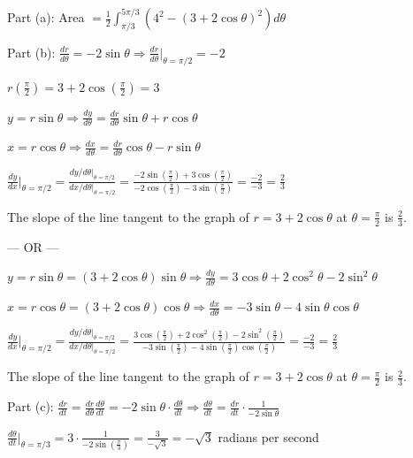 \documentclass[12pt,addpoints,answers]{exam}
\begin{document}
\begin{questions}
\begin{solution}
Part (a): Area $= \frac{1}{2}\int_{\pi/3}^{5\pi/3} \left(4^2 - (3 + 2\cos\theta)^2\right) d\theta$ \par Part (b): $\frac{dr}{d\theta} = -2\sin\theta \Rightarrow \frac{dr}{d\theta}\bigg|_{\theta=\pi/2} = -2$ \par $r\left(\frac{\pi}{2}\right) = 3 + 2\cos\left(\frac{\pi}{2}\right) = 3$ \par $y = r\sin\theta \Rightarrow \frac{dy}{d\theta} = \frac{dr}{d\theta}\sin\theta + r\cos\theta$ \par $x = r\cos\theta \Rightarrow \frac{dx}{d\theta} = \frac{dr}{d\theta}\cos\theta - r\sin\theta$ \par $\frac{dy}{dx}\bigg|_{\theta=\pi/2} = \frac{dy/d\theta\big|_{\theta=\pi/2}}{dx/d\theta\big|_{\theta=\pi/2}} = \frac{-2\sin\left(\frac{\pi}{2}\right) + 3\cos\left(\frac{\pi}{2}\right)}{-2\cos\left(\frac{\pi}{2}\right) - 3\sin\left(\frac{\pi}{2}\right)} = \frac{-2}{-3} = \frac{2}{3}$ \par The slope of the line tangent to the graph of $r = 3 + 2\cos\theta$ at $\theta = \frac{\pi}{2}$ is $\frac{2}{3}$. \par — OR — \par $y = r\sin\theta = (3 + 2\cos\theta)\sin\theta \Rightarrow \frac{dy}{d\theta} = 3\cos\theta + 2\cos^2\theta - 2\sin^2\theta$ \par $x = r\cos\theta = (3 + 2\cos\theta)\cos\theta \Rightarrow \frac{dx}{d\theta} = -3\sin\theta - 4\sin\theta\cos\theta$ \par $\frac{dy}{dx}\bigg|_{\theta=\pi/2} = \frac{dy/d\theta\big|_{\theta=\pi/2}}{dx/d\theta\big|_{\theta=\pi/2}} = \frac{3\cos\left(\frac{\pi}{2}\right) + 2\cos^2\left(\frac{\pi}{2}\right) - 2\sin^2\left(\frac{\pi}{2}\right)}{-3\sin\left(\frac{\pi}{2}\right) - 4\sin\left(\frac{\pi}{2}\right)\cos\left(\frac{\pi}{2}\right)} = \frac{-2}{-3} = \frac{2}{3}$ \par The slope of the line tangent to the graph of $r = 3 + 2\cos\theta$ at $\theta = \frac{\pi}{2}$ is $\frac{2}{3}$. \par Part (c): $\frac{dr}{dt} = \frac{dr}{d\theta} \frac{d\theta}{dt} = -2\sin\theta \cdot \frac{d\theta}{dt} \Rightarrow \frac{d\theta}{dt} = \frac{dr}{dt} \cdot \frac{1}{-2\sin\theta}$ \par $\frac{d\theta}{dt}\bigg|_{\theta=\pi/3} = 3 \cdot \frac{1}{-2\sin\left(\frac{\pi}{3}\right)} = \frac{3}{-\sqrt{3}} = -\sqrt{3}$ radians per second

\end{solution}
\end{questions}
\end{document}
